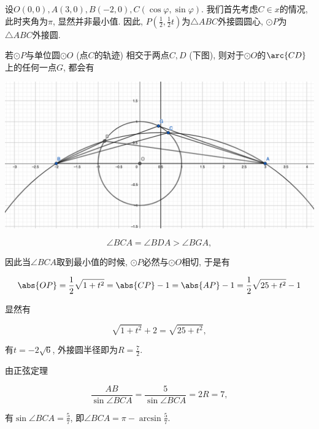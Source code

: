 \documentclass[8pt]{article}
\begin{document}
\begin{easonbigproblem}
			 设\(O(0, 0), A(3, 0), B(-2, 0), C(\cos \varphi, \sin \varphi)\). 我们首先考虑\(C \in x\)的情况, 此时夹角为\(\pi\), 显然并非最小值. 因此, \(\displaystyle P\left(\frac{1}{2}, \frac{1}{2}t\right)\)为\(\triangle ABC\)外接圆圆心, \(\odot P\)为\(\triangle ABC\)外接圆.

			若\(\odot P\)与单位圆\(\odot O\) (点\(C\)的轨迹) 相交于两点\(C, D\) (下图), 则对于\(\odot O\)的\(\arc{CD}\)上的任何一点\(G\), 都会有

			\begin{center}
				\includegraphics[scale = 0.4]{arc}
			\end{center}

			\begin{displaymath}
				\angle BCA = \angle BDA > \angle BGA,
			\end{displaymath}

			因此当\(\angle BCA\)取到最小值的时候, \(\odot P\)必然与\(\odot O\)相切, 于是有



			\begin{displaymath}
				\abs{OP} = \frac{1}{2} \sqrt{1 + t^2} = \abs{CP} - 1 = \abs{AP} - 1 = \frac{1}{2} \sqrt{25 + t^2} - 1
			\end{displaymath}

			显然有

			\begin{displaymath}
				\sqrt{1 + t^2} + 2 = \sqrt{25 + t^2},
			\end{displaymath}

			有\(t = - 2\sqrt{6}\), 外接圆半径即为\(R = \displaystyle \frac{7}{2}\).

			由正弦定理

			\begin{displaymath}
				\frac{AB}{\sin \angle BCA} = \frac{5}{\sin \angle BCA} = 2R = 7,
			\end{displaymath}

			有\(\sin \angle BCA = \displaystyle \frac{5}{7}\), 即\(\angle BCA = \displaystyle \pi -  \arcsin \frac{5}{7}\).

		\end{easonbigproblem}

	\newpage
	
	
\end{document}
